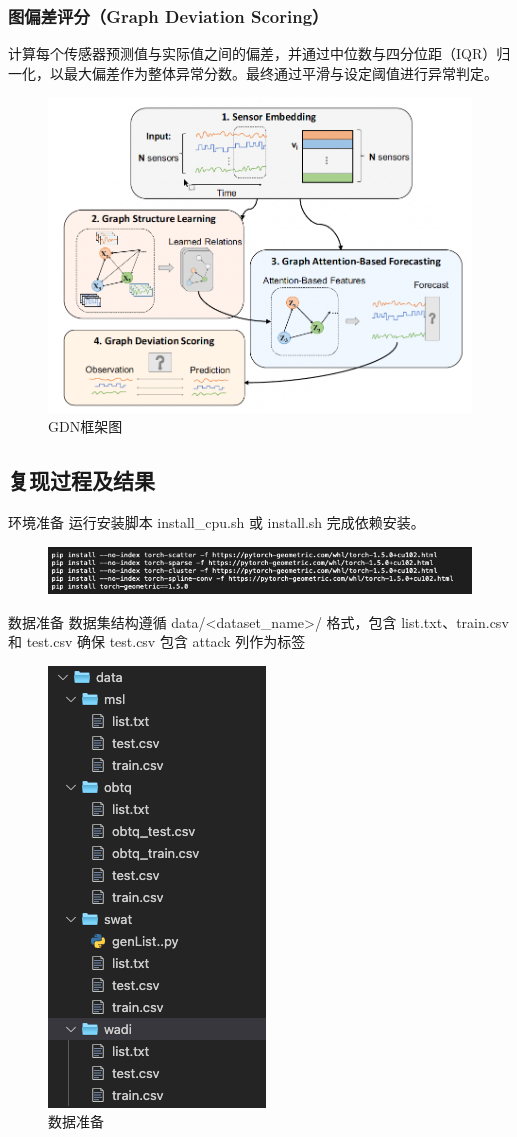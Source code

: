 \documentclass[hyperref,a4paper,UTF8]{ctexart}
\begin{document}
\subsubsection{图偏差评分（Graph Deviation Scoring）}
    计算每个传感器预测值与实际值之间的偏差，并通过中位数与四分位距（IQR）归一化，以最大偏差作为整体异常分数。最终通过平滑与设定阈值进行异常判定。
\begin{figure}[H]
    \centering
    \includegraphics[width=0.75\linewidth]{图偏差网络框架图.png}
    \caption{GDN框架图}
    \label{fig:enter-label}
\end{figure}

\subsection{复现过程及结果}
环境准备
运行安装脚本 install\_cpu.sh 或 install.sh 完成依赖安装。
\begin{figure}
    \centering
    \includegraphics[width=0.75\linewidth]{复现/install.png}
    \label{fig:enter-label}
\end{figure}
数据准备
数据集结构遵循 data/<dataset\_name>/ 格式，包含 list.txt、train.csv 和 test.csv
确保 test.csv 包含 attack 列作为标签
\begin{figure}
    \centering
    \includegraphics[width=0.25\linewidth]{复现/dataset.png}
    \caption{数据准备}
    \label{fig:enter-label}
\end{figure}
\end{document}
